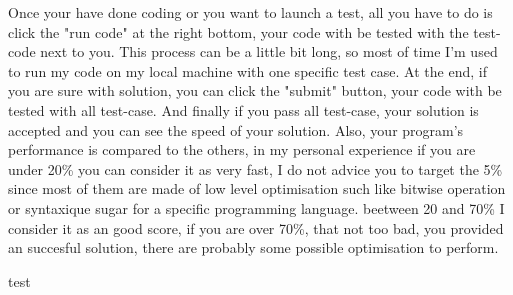 \documentclass[12pt, letterpaper]{article}
\begin{document}
Once your have done coding or you want to launch a test, all you have to do is click the "run code" at the right bottom, your code with be tested with the test-code next to you.
This process can be a little bit long, so most of time I'm used to run my code on my local machine with one specific test case.
At the end, if you are sure with solution, you can click the "submit" button, your code with be tested with all test-case. And finally if you pass all test-case, your solution is accepted and you can see the speed of your solution. Also, your program's performance is compared to the others, in my personal experience if you are under 20\% you can consider it as very fast, I do not advice you to target the 5\% since most of them are made of low level optimisation such like bitwise operation or syntaxique sugar for a specific programming language.
beetween 20 and 70\% I consider it as an good score, if you are over 70\%, that not too bad, you provided an succesful solution, there are probably some possible optimisation to perform.






test
\end{document}

